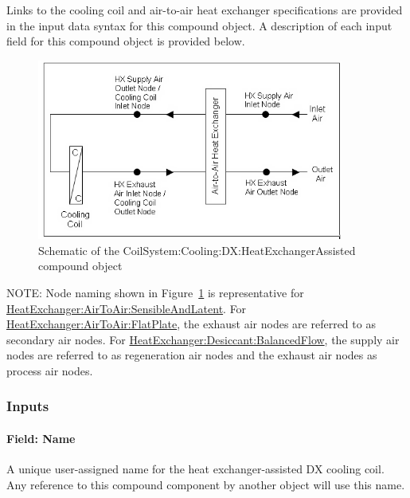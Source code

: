 Links to the cooling coil and air-to-air heat exchanger specifications are provided in the input data syntax for this compound object. A description of each input field for this compound object is provided below.

\begin{figure}[hbtp] %
\centering
\includegraphics[width=0.9\textwidth, height=0.9\textheight, keepaspectratio=true]{media/image369.png}
\caption{Schematic of the CoilSystem:Cooling:DX:HeatExchangerAssisted compound object \protect \label{fig:schematic-of-the-coilsystem-cooling-dx}}
\end{figure}

NOTE: Node naming shown in Figure~\ref{fig:schematic-of-the-coilsystem-cooling-dx} is representative for \hyperref[heatexchangerairtoairsensibleandlatent]{HeatExchanger:AirToAir:SensibleAndLatent}. For \hyperref[heatexchangerairtoairflatplate]{HeatExchanger:AirToAir:FlatPlate}, the exhaust air nodes are referred to as secondary air nodes. For \hyperref[heatexchangerdesiccantbalancedflow]{HeatExchanger:Desiccant:BalancedFlow}, the supply air nodes are referred to as regeneration air nodes and the exhaust air nodes as process air nodes.

\subsubsection{Inputs}\label{inputs-25}

\paragraph{Field: Name}\label{field-name-24-000}

A unique user-assigned name for the heat exchanger-assisted DX cooling coil. Any reference to this compound component by another object will use this name.

